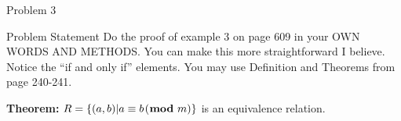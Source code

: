 \begin{problem}{Problem 3}
    \begin{statement}{Problem Statement}
        Do the proof of example 3 on page 609 in your OWN WORDS AND METHODS. You can make this more straightforward I believe. Notice the “if and only if” elements. You may use Definition and Theorems 
        from page 240-241.
    \end{statement}

    \begin{Highlight}[Solution]
        \noindent \textbf{Theorem:} $R = \{(a,b) | a \equiv b \hspace*{1pt} (\hspace*{-3pt} \text{ \textbf{mod} } m)\}$ is an equivalence relation. \vspace*{1em}


\end{Highlight}
\end{problem}

